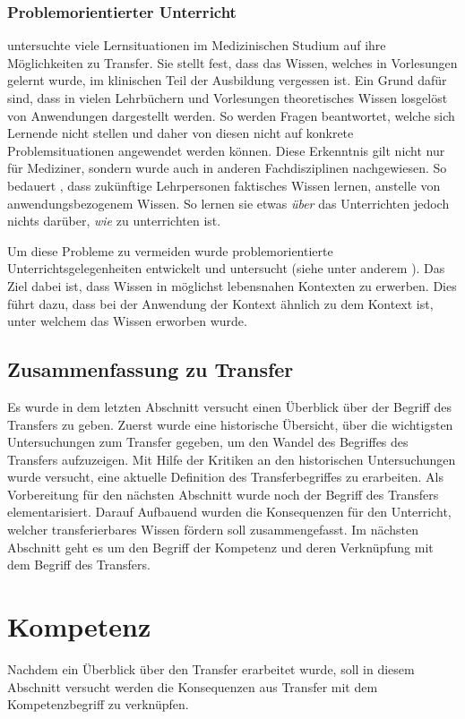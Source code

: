 \subsubsection{Problemorientierter Unterricht}

\citet{Williams1992} untersuchte viele Lernsituationen im Medizinischen Studium auf ihre Möglichkeiten zu Transfer. Sie stellt fest, dass das Wissen, welches in Vorlesungen gelernt wurde, im klinischen Teil der Ausbildung vergessen ist. Ein Grund dafür sind, dass in vielen Lehrbüchern und Vorlesungen theoretisches Wissen losgelöst von Anwendungen dargestellt werden. So werden Fragen beantwortet, welche sich Lernende nicht stellen und daher von diesen nicht auf konkrete Problemsituationen angewendet werden können.
Diese Erkenntnis gilt nicht nur für Mediziner, sondern wurde auch in anderen Fachdisziplinen nachgewiesen. So bedauert \citet{Shuell1996}, dass zukünftige Lehrpersonen faktisches Wissen lernen, anstelle von anwendungsbezogenem Wissen. So lernen sie etwas \textit{über} das Unterrichten jedoch nichts darüber, \textit{wie} zu unterrichten ist.

Um diese Probleme zu vermeiden wurde problemorientierte Unterrichtsgelegenheiten entwickelt und untersucht (siehe unter anderem \citet{Barrows1985,Michael1993,Shuell1996,Corte2003,Reusser2005,Fassler2007,Pea2013b}). Das Ziel dabei ist, dass Wissen in möglichst lebensnahen Kontexten zu erwerben. Dies führt dazu, dass bei der Anwendung der Kontext ähnlich zu dem Kontext ist, unter welchem das Wissen erworben wurde.

\subsection{Zusammenfassung zu Transfer}

Es wurde in dem letzten Abschnitt versucht einen Überblick über der Begriff des Transfers zu geben. Zuerst wurde eine historische Übersicht, über die wichtigsten Untersuchungen zum Transfer gegeben, um den Wandel des Begriffes des Transfers aufzuzeigen. Mit Hilfe der Kritiken an den historischen Untersuchungen wurde versucht, eine aktuelle Definition des Transferbegriffes zu erarbeiten. Als Vorbereitung für den nächsten Abschnitt wurde noch der Begriff des Transfers elementarisiert. Darauf Aufbauend wurden die Konsequenzen für den Unterricht, welcher transferierbares Wissen fördern soll zusammengefasst. Im nächsten Abschnitt geht es um den Begriff der Kompetenz und deren Verknüpfung mit dem Begriff des Transfers.


\section{Kompetenz}

Nachdem ein Überblick über den Transfer erarbeitet wurde, soll in diesem Abschnitt versucht werden die Konsequenzen aus Transfer mit dem Kompetenzbegriff zu verknüpfen.

